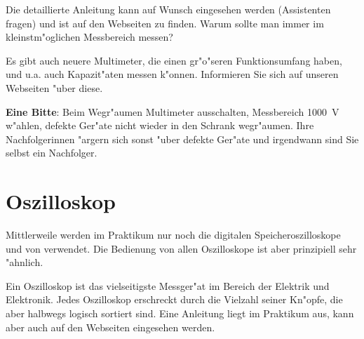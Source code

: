 Die detaillierte Anleitung kann auf Wunsch eingesehen werden
(Assistenten fragen) und ist auf den Webseiten zu finden. Warum
sollte man immer im kleinstm"oglichen Messbereich messen?

Es gibt auch neuere Multimeter, die einen gr"o"seren Funktionsumfang
haben, und u.a. auch Kapazit"aten messen k"onnen. Informieren Sie
sich auf unseren Webseiten "uber diese.

{\bf Eine Bitte}: Beim Wegr"aumen Multimeter ausschalten, Messbereich
1000~V w"ahlen, defekte Ger"ate nicht wieder in den Schrank wegr"aumen.
Ihre Nachfolgerinnen "argern sich sonst "uber defekte Ger"ate und
irgendwann sind Sie selbst ein Nachfolger.




\section{Oszilloskop}

Mittlerweile werden im Praktikum nur noch die digitalen
Speicheroszilloskope  und
 von  verwendet. Die Bedienung von
allen Oszilloskope ist aber prinzipiell sehr "ahnlich.

Ein Oszilloskop ist das vielseitigste Messger"at im Bereich der
Elektrik und Elektronik. Jedes Oszilloskop erschreckt durch die
Vielzahl seiner Kn"opfe, die aber halbwegs logisch sortiert sind.
Eine Anleitung liegt im Praktikum aus, kann aber auch auf den
Webseiten eingesehen werden.

